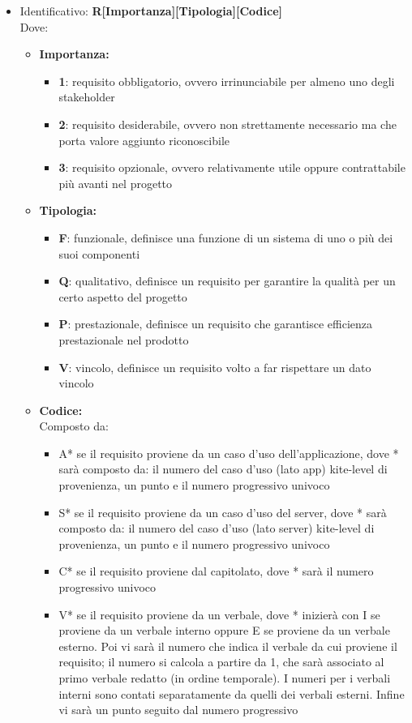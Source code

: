 \begin{itemize}
	\item Identificativo: \textbf{R[Importanza][Tipologia][Codice]}\\
Dove:
\begin{itemize}
		\item \textbf{Importanza:}
		\begin{itemize}
			\item \textbf{1}: requisito obbligatorio, ovvero irrinunciabile per almeno uno degli stakeholder
			\item \textbf{2}: requisito desiderabile, ovvero non strettamente necessario ma che porta valore aggiunto riconoscibile
			\item \textbf{3}: requisito opzionale, ovvero relativamente utile oppure contrattabile più avanti nel progetto
		\end{itemize}
		\item \textbf{Tipologia:}
		\begin{itemize}
			\item \textbf{F}: funzionale, definisce una funzione di un sistema di uno o più dei suoi componenti
			\item \textbf{Q}: qualitativo, definisce un requisito per garantire la qualità per un certo aspetto del progetto
			\item \textbf{P}: prestazionale, definisce un requisito che garantisce efficienza prestazionale nel prodotto
			\item \textbf{V}: vincolo, definisce un requisito volto a far rispettare un dato vincolo
		\end{itemize}
		\item \textbf{Codice:}\\
		Composto da:
		\begin{itemize}
			\item A* se il requisito proviene da un caso d'uso dell'applicazione, dove * sarà composto da: il numero del caso d'uso (lato app) kite-level di provenienza, un punto e il numero progressivo univoco
			\item S* se il requisito proviene da un caso d'uso del server, dove * sarà composto da: il numero del caso d'uso (lato server) kite-level di provenienza, un punto e il numero progressivo univoco
			\item C* se il requisito proviene dal capitolato, dove * sarà il numero progressivo univoco
			\item V* se il requisito proviene da un verbale, dove * inizierà con I se proviene da un verbale interno oppure E se proviene da un verbale esterno. Poi vi sarà il numero che indica il verbale da cui proviene il requisito; il numero si calcola a partire da 1, che sarà associato al primo verbale redatto (in ordine temporale). I numeri per i verbali interni sono contati separatamente da quelli dei verbali esterni. Infine vi sarà un punto seguito dal numero progressivo

\end{itemize}
\end{itemize}
\end{itemize}
